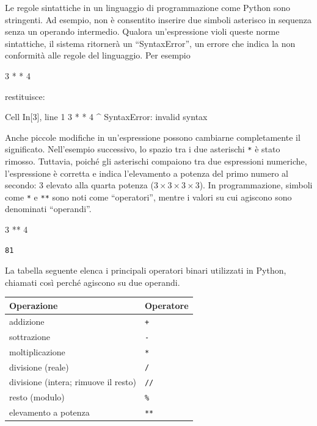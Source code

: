\documentclass[
  letterpaper,
  krantz2]{{[}./krantz{]}}
\newenvironment{Shaded}{\begin{snugshade}}{\end{snugshade}}
\newcommand{\DecValTok}[1]{\textcolor[rgb]{0.68,0.00,0.00}{#1}}
\newcommand{\ExtensionTok}[1]{\textcolor[rgb]{0.00,0.23,0.31}{#1}}
\newcommand{\NormalTok}[1]{\textcolor[rgb]{0.00,0.23,0.31}{#1}}
\newcommand{\OperatorTok}[1]{\textcolor[rgb]{0.37,0.37,0.37}{#1}}
\newcommand{\PreprocessorTok}[1]{\textcolor[rgb]{0.68,0.00,0.00}{#1}}
\newcommand{\SpecialStringTok}[1]{\textcolor[rgb]{0.13,0.47,0.30}{#1}}
\begin{document}
Le regole sintattiche in un linguaggio di programmazione come Python
sono stringenti. Ad esempio, non è consentito inserire due simboli
asterisco in sequenza senza un operando intermedio. Qualora
un'espressione violi queste norme sintattiche, il sistema ritornerà un
``SyntaxError'', un errore che indica la non conformità alle regole del
linguaggio. Per esempio

\begin{Shaded}
\begin{Highlighting}[]
\DecValTok{3} \OperatorTok{*} \OperatorTok{*} \DecValTok{4}
\end{Highlighting}
\end{Shaded}

restituisce:

\begin{Shaded}
\begin{Highlighting}[]
 \ExtensionTok{Cell}\NormalTok{ In}\PreprocessorTok{[}\SpecialStringTok{3}\PreprocessorTok{]}\NormalTok{, line 1}
    \ExtensionTok{3} \PreprocessorTok{*} \PreprocessorTok{*}\NormalTok{ 4}
        \ExtensionTok{\^{}}
\ExtensionTok{SyntaxError:}\NormalTok{ invalid syntax}
\end{Highlighting}
\end{Shaded}

Anche piccole modifiche in un'espressione possono cambiarne
completamente il significato. Nell'esempio successivo, lo spazio tra i
due asterischi \texttt{*} è stato rimosso. Tuttavia, poiché gli
asterischi compaiono tra due espressioni numeriche, l'espressione è
corretta e indica l'elevamento a potenza del primo numero al secondo: 3
elevato alla quarta potenza (\(3 \times 3 \times 3 \times 3\)). In
programmazione, simboli come \texttt{*} e \texttt{**} sono noti come
``operatori'', mentre i valori su cui agiscono sono denominati
``operandi''.

\begin{Shaded}
\begin{Highlighting}[]
\DecValTok{3} \OperatorTok{**} \DecValTok{4}
\end{Highlighting}
\end{Shaded}

\begin{verbatim}
81
\end{verbatim}

La tabella seguente elenca i principali operatori binari utilizzati in
Python, chiamati così perché agiscono su due operandi.

\begin{longtable}[]{@{}ll@{}}
\toprule\noalign{}
Operazione & Operatore \\
\midrule\noalign{}
\endhead
\bottomrule\noalign{}
\endlastfoot
addizione & \texttt{+} \\
sottrazione & \texttt{-} \\
moltiplicazione & \texttt{*} \\
divisione (reale) & \texttt{/} \\
divisione (intera; rimuove il resto) & \texttt{//} \\
resto (modulo) & \texttt{\%} \\
elevamento a potenza & \texttt{**} \\
\end{longtable}
\end{document}
